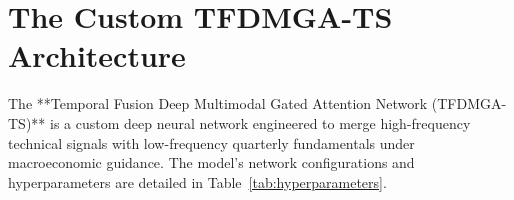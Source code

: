 \documentclass[11pt]{article}
\begin{document}
\section{The Custom TFDMGA-TS Architecture}
The **Temporal Fusion Deep Multimodal Gated Attention Network (TFDMGA-TS)** is a custom deep neural network engineered to merge high-frequency technical signals with low-frequency quarterly fundamentals under macroeconomic guidance. The model's network configurations and hyperparameters are detailed in Table~\ref{tab:hyperparameters}.

\begin{table}[H]
    \centering
    \caption{Model Hyperparameters and Network Architecture}
    \label{tab:hyperparameters}
\end{table}
\end{document}
